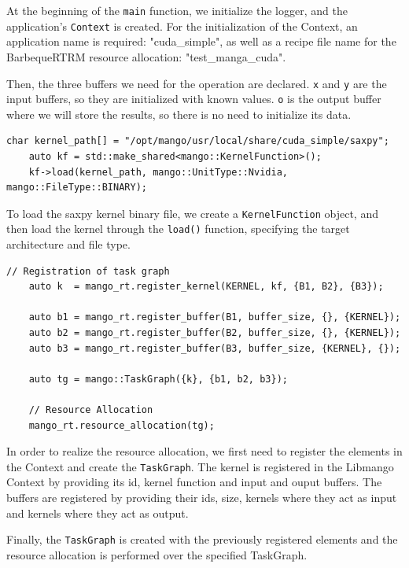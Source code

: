 At the beginning of the \texttt{main} function, we initialize the logger, and the application's \texttt{Context} is created. For the initialization of the Context, an application name is required: "cuda\_simple", as well as a recipe file name for the BarbequeRTRM resource allocation: "test\_manga\_cuda".

Then, the three buffers we need for the operation are declared. \texttt{x} and \texttt{y} are the input buffers, so they are initialized with known values. \texttt{o} is the output buffer where we will store the results, so there is no need to initialize its data.

\begin{lstlisting}[style=CStyle, caption=Sample - Kernel loading]
    char kernel_path[] = "/opt/mango/usr/local/share/cuda_simple/saxpy";
    auto kf = std::make_shared<mango::KernelFunction>();
    kf->load(kernel_path, mango::UnitType::Nvidia, mango::FileType::BINARY);
\end{lstlisting}

To load the saxpy kernel binary file, we create a \texttt{KernelFunction} object, and then load the kernel through the \texttt{load()} function, specifying the target architecture and file type.

\begin{lstlisting}[style=CStyle, caption=Sample - TaskGraph registration and resource allocation]
    // Registration of task graph
    auto k  = mango_rt.register_kernel(KERNEL, kf, {B1, B2}, {B3});

    auto b1 = mango_rt.register_buffer(B1, buffer_size, {}, {KERNEL});
    auto b2 = mango_rt.register_buffer(B2, buffer_size, {}, {KERNEL});
    auto b3 = mango_rt.register_buffer(B3, buffer_size, {KERNEL}, {});

    auto tg = mango::TaskGraph({k}, {b1, b2, b3});

    // Resource Allocation
    mango_rt.resource_allocation(tg);
\end{lstlisting}

In order to realize the resource allocation, we first need to register the elements in the Context and create the \texttt{TaskGraph}.
The kernel is registered in the Libmango Context by providing its id, kernel function and input and ouput buffers.
The buffers are registered by providing their ids, size, kernels where they act as input and kernels where they act as output.

Finally, the \texttt{TaskGraph} is created with the previously registered elements and the resource allocation is performed over the specified TaskGraph.

